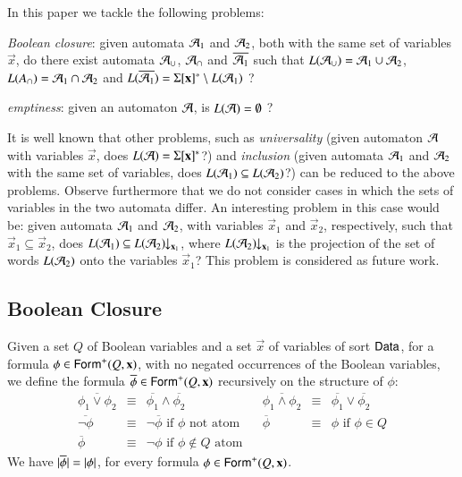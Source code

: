 \documentclass[10pt]{llncs}
\begin{document}
In this paper we tackle the following problems: \begin{compactenum}
\item \emph{Boolean closure}: given automata $\mathcal{A}_1$ and $\mathcal{A}_2$, both
  with the same set of variables $\vec{x}$, do there exist automata
  $\mathcal{A}_\cup$, $\mathcal{A}_\cap$ and $\overline{\mathcal{A}_1}$ such that $L(\mathcal{A}_\cup) =
  \mathcal{A}_1 \cup \mathcal{A}_2$, $L(A_\cap) = \mathcal{A}_1 \cap \mathcal{A}_2$ and
  $L(\overline{\mathcal{A}_1}) = \Sigma[\mathbf x]^* \setminus L(\mathcal{A}_1)$ ?
%
\item \emph{emptiness}: given an automaton $\mathcal{A}$, is $L(\mathcal{A}) =
  \emptyset$ ?
\end{compactenum}

It is well known that other problems, such as \emph{universality}
(given automaton $\mathcal{A}$ with variables $\vec{x}$, does $L(\mathcal{A}) =
\Sigma[\mathbf x]^*$?) and \emph{inclusion} (given automata $\mathcal{A}_1$ and
$\mathcal{A}_2$ with the same set of variables, does $L(\mathcal{A}_1) \subseteq
L(\mathcal{A}_2)$?) can be reduced to the above problems. Observe furthermore
that we do not consider cases in which the sets of variables in the
two automata differ. An interesting problem in this case would be: given
automata $\mathcal{A}_1$ and $\mathcal{A}_2$, with variables $\vec{x}_1$ and
$\vec{x}_2$, respectively, such that $\vec{x}_1 \subseteq \vec{x}_2$,
does $L(\mathcal{A}_1) \subseteq {L(\mathcal{A}_2)}\!\!\downarrow_{{\mathbf x_1}}$, where
${L(\mathcal{A}_2)}\!\!\downarrow_{{\mathbf x_1}}$ is the projection of the set of words
$L(\mathcal{A}_2)$ onto the variables $\vec{x}_1$? This problem is considered
as future work.

\subsection{Boolean Closure}

Given a set $Q$ of Boolean variables and a set $\vec{x}$ of variables
of sort $\mathsf{Data}$, for a formula $\phi \in \mathsf{Form}^+(Q,\mathbf x)$, with no
negated occurrences of the Boolean variables, we define the formula
$\overline{\phi} \in \mathsf{Form}^+(Q,\mathbf x)$ recursively on the structure
of $\phi$:
\[\begin{array}{rclcrcl}
\overline{\phi_1 \vee \phi_2} & \equiv & \overline{\phi_1} \wedge \overline{\phi_2} && 
\overline{\phi_1 \wedge \phi_2} & \equiv & \overline{\phi_1} \vee \overline{\phi_2} \\ 
\overline{\neg\phi} & \equiv & \neg \overline{\phi} \text{ if $\phi$ not atom} &&
\overline{\phi} & \equiv & \phi \text{ if $\phi \in Q$} \\
\overline{\phi} & \equiv & \neg\phi \text{ if $\phi \not\in Q$ atom}
\end{array}\]
We have ${|{\overline{\phi}}|} = {|{\phi}|}$, for every formula $\phi
\in \mathsf{Form}^+(Q,\mathbf x)$.
\end{document}
